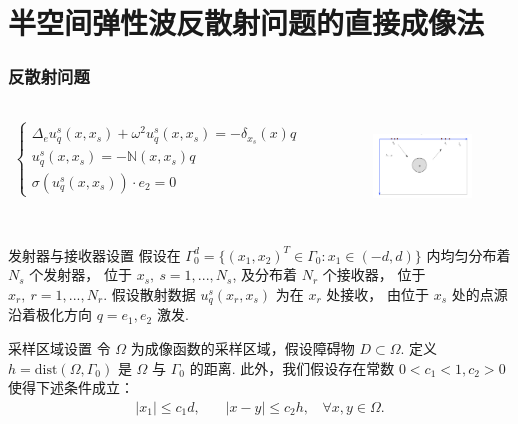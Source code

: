 \documentclass[8pt]{beamer}
\newcommand{\R}{\mathbb{R}}
\newcommand{\Ga}{\Gamma}
\newcommand{\Om}{\Omega}
\newcommand{\bks}{\backslash}
\newcommand{\dist}{\mathrm{dist}}
\newcommand{\N}{\mathbb{N}}
\newcommand{\ben}{\begin{eqnarray*}}
\newcommand{\een}{\end{eqnarray*}}
\begin{document}
\section{半空间弹性波反散射问题的直接成像法}

\begin{frame}
\frametitle{反散射问题}
\begin{columns}
\begin{column}{.5\textwidth}

\begin{tiny}
\begin{eqnarray*}
\left\{
\begin{array}{lll}
\Delta_e u_q^s(x,x_s) + \omega^2u_q^s(x,x_s)= -\delta_{x_s}(x)q \ \ \ \ &in&\R_+^2\bks \bar{D}\\
u_q^s(x,x_s)=-\N(x,x_s)q \ \  \ \ \ \ \ \ \ &on& \ \Ga_D  \ \ \\
\sigma(u_q^s(x,x_s))\cdot e_2=0 \ \ &on& \ \Ga_0
\end{array}
\right.
\end{eqnarray*}
\end{tiny}
\end{column}

\begin{column}{.35\textwidth}
\begin{figure}
  \centering
  \includegraphics[width=4cm,height=2.5cm]{./figure/half_forward}
\end{figure}
\end{column}
\end{columns}
\begin{block}{发射器与接收器设置}
假设在 $\Ga_0^d=\{(x_1,x_2)^T\in\Ga_0: x_1\in (-d,d)\}$ 内均匀分布着 $N_s$ 个发射器， 位于 $x_s, \ s= 1,...,N_s$, 及分布着 $N_r$ 个接收器， 位于 $x_r, \ r=1,...,N_r$. 假设散射数据 $u_q^s(x_r,x_s)$ 为在 $x_r$ 处接收， 由位于 $x_s$ 处的点源沿着极化方向 $q=e_1, e_2$ 激发.
\end{block}
\begin{block}{采样区域设置}
令 $\Omega$ 为成像函数的采样区域，假设障碍物 $D\subset \Om$. 定义 $h=\dist(\Omega,\Gamma_0)$ 是 $\Omega$ 与 $\Gamma_0$ 的距离. 此外，我们假设存在常数 $0<c_1<1,c_2>0$ 使得下述条件成立：
\ben\label{d0}
|x_1|\leq c_1 d , \ \ \ \ \ \ \ \ |x-y|\leq c_2 h ,\ \ \ \ \forall x,y \in \Omega.
\een
\end{block}
\end{frame}
\end{document}

